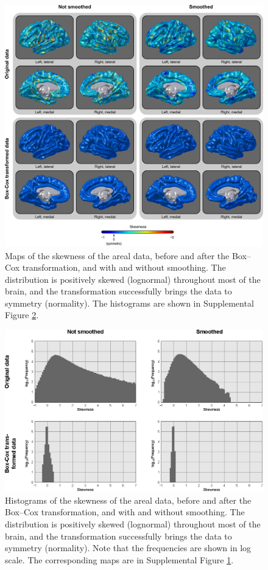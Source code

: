 \begin{figure}[!p]  %
\centering
\includegraphics[width=14cm]{images/skewness.png}
\caption[Maps of the skewness of the areal data.]{Maps of the skewness of the areal data, before and after the Box--Cox transformation, and with and without smoothing. The distribution is positively skewed (lognormal) throughout most of the brain, and the transformation successfully brings the data to symmetry (normality). The histograms are shown in Supplemental Figure \ref{fig:skewness-hist}.}
\label{fig:skewness}
\end{figure}

\begin{figure}[!p]  %
\centering
\includegraphics[width=14cm]{images/skewness-hist.eps}
\caption[Histograms of the skewness of the areal data.]{Histograms of the skewness of the areal data, before and after the Box--Cox transformation, and with and without smoothing. The distribution is positively skewed (lognormal) throughout most of the brain, and the transformation successfully brings the data to symmetry (normality). Note that the frequencies are shown in log scale. The corresponding maps are in Supplemental Figure \ref{fig:skewness}.}
\label{fig:skewness-hist}
\end{figure}

